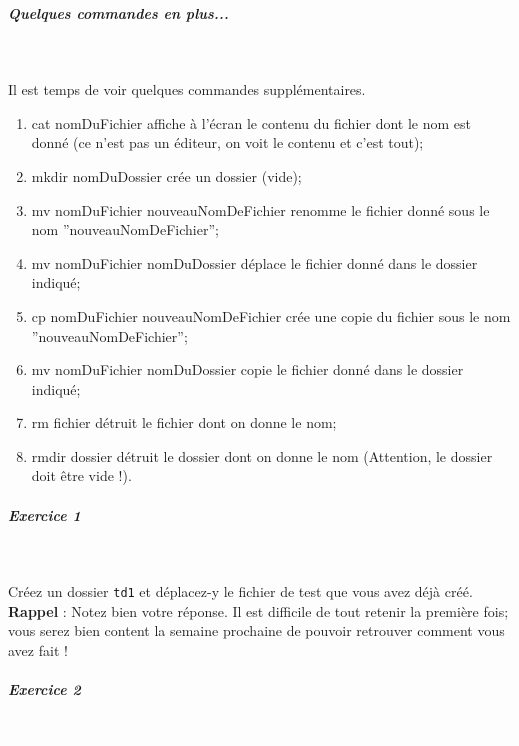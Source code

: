 \documentclass[11pt,a4paper]{article}
\begin{document}
			
		\subparagraph{Quelques commandes en plus...} 
		
					\textcolor{white}{.} \par
				
            \par
        
Il est temps de voir quelques commandes suppl\'ementaires.

					\begin{enumerate}
				
			\item cat nomDuFichier  affiche \`a l'\'ecran le contenu du fichier dont le nom est donn\'e (ce n'est pas un \'editeur, on voit le contenu et c'est tout);
			\item mkdir nomDuDossier  cr\'ee un dossier (vide);
			\item mv nomDuFichier nouveauNomDeFichier  renomme le fichier donn\'e sous le nom ''nouveauNomDeFichier'';
			\item mv nomDuFichier nomDuDossier  d\'eplace le fichier donn\'e dans le dossier indiqu\'e; 
			\item cp nomDuFichier nouveauNomDeFichier  cr\'ee une copie du fichier sous le nom ''nouveauNomDeFichier'';
			\item mv nomDuFichier nomDuDossier  copie le fichier donn\'e dans le dossier indiqu\'e;
			\item rm fichier  d\'etruit le fichier dont on donne le nom; 
			\item rmdir dossier  d\'etruit le dossier dont on donne le nom (Attention, le dossier doit \^etre vide !). 
					\end{enumerate}
				
			
		\subparagraph{Exercice 1} 
		
					\textcolor{white}{.} \par
				
            \par
        
Cr\'eez un dossier  \texttt{td1}  et d\'eplacez-y le fichier de test que vous avez d\'ej\`a cr\'e\'e.
 \textbf{Rappel}  : Notez bien votre r\'eponse. Il est difficile de tout retenir la premi\`ere fois; vous serez bien content la semaine prochaine de pouvoir retrouver comment vous avez fait !

			
		\subparagraph{Exercice 2} 
		
					\textcolor{white}{.} \par
				
            \par
        
\end{document}
